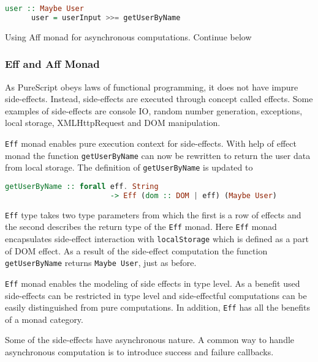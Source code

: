 \documentclass[article]{aaltoseries}
\begin{document}
    \begin{lstlisting}[language=Haskell]
      user :: Maybe User
      user = userInput >>= getUserByName
    \end{lstlisting}

    Using Aff monad for asynchronous computations. Continue below


    \subsubsection{Eff and Aff Monad}
      As PureScript obeys laws of functional programming, it does not have
      impure side-effects. Instead, side-effects are executed through concept
      called effects. Some examples of side-effects are console IO, random
      number generation, exceptions, local storage, XMLHttpRequest and DOM
      manipulation.

      \lstinline|Eff| monad enables pure execution context for side-effects.
      With help of effect monad the function \lstinline|getUserByName| can now
      be rewritten to return the user data from local storage. The definition of
      \lstinline|getUserByName| is updated to

      \begin{lstlisting}[language=Haskell]
        getUserByName :: forall eff. String 
                        -> Eff (dom :: DOM | eff) (Maybe User)
      \end{lstlisting}
 
      \lstinline|Eff| type takes two type parameters from which the first is a
      row of effects and the second describes the return type of the
      \lstinline|Eff| monad. Here \lstinline|Eff| monad encapsulates side-effect
      interaction with \lstinline|localStorage| which is defined as a part of
      DOM effect. As a result of the side-effect computation the function
      \lstinline|getUserByName| returns \lstinline|Maybe User|, just as before.
 
      \lstinline|Eff| monad enables the modeling of side effects in type level.
      As a benefit used side-effects can be restricted in type level and
      side-effectful computations can be easily distinguished from pure
      computations. In addition, \lstinline|Eff| has all the benefits of a monad
      category.
 
      Some of the side-effects have asynchronous nature. A common way to handle
      asynchronous computation is to introduce success and failure callbacks.
 
\end{document}
